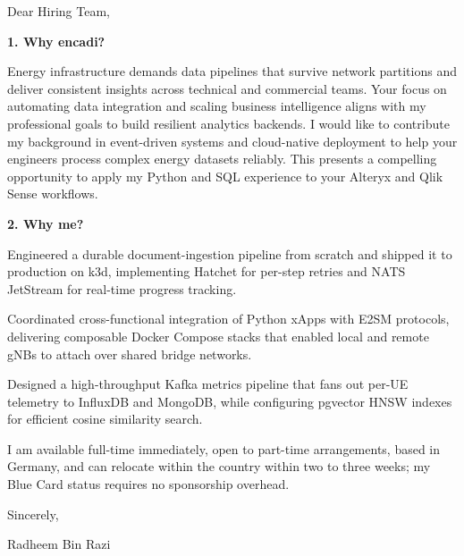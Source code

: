 \documentclass[11pt,a4paper]{coverletter}
\begin{document}

\opening{Dear Hiring Team,}

\vspace{8pt}\noindent\textbf{1. Why encadi?}\par\vspace{3pt}

Energy infrastructure demands data pipelines that survive network partitions and deliver consistent insights across technical and commercial teams. Your focus on automating data integration and scaling business intelligence aligns with my professional goals to build resilient analytics backends. I would like to contribute my background in event-driven systems and cloud-native deployment to help your engineers process complex energy datasets reliably. This presents a compelling opportunity to apply my Python and SQL experience to your Alteryx and Qlik Sense workflows.

\vspace{8pt}\noindent\textbf{2. Why me?}\par\vspace{3pt}

\bullets

  \item Engineered a durable document-ingestion pipeline from scratch and shipped it to production on k3d, implementing Hatchet for per-step retries and NATS JetStream for real-time progress tracking.

  \item Coordinated cross-functional integration of Python xApps with E2SM protocols, delivering composable Docker Compose stacks that enabled local and remote gNBs to attach over shared bridge networks.

  \item Designed a high-throughput Kafka metrics pipeline that fans out per-UE telemetry to InfluxDB and MongoDB, while configuring pgvector HNSW indexes for efficient cosine similarity search.

\bulletsend

I am available full-time immediately, open to part-time arrangements, based in Germany, and can relocate within the country within two to three weeks; my Blue Card status requires no sponsorship overhead.

\closing{Sincerely,}{Radheem Bin Razi}

\clearpage
{}

\end{document}
